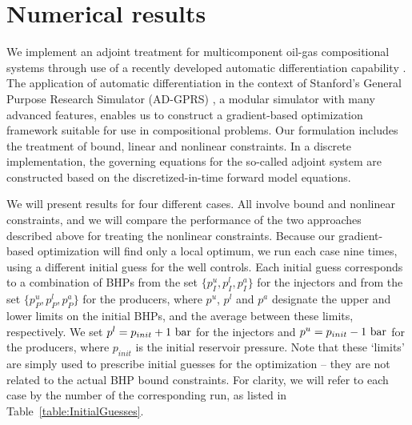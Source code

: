 \chapter{Numerical results}  \label{sec:results}


We implement an adjoint treatment for multicomponent oil-gas
compositional systems through use of a recently developed automatic
differentiation capability \citep{Younis:2010}. The application of automatic
differentiation in the context of Stanford's General Purpose Research Simulator
(AD-GPRS) \citep{Cao:Thesis}, a modular simulator with many advanced features,
enables us to construct a gradient-based optimization framework suitable for
use in compositional problems. Our formulation includes the treatment of
bound, linear and nonlinear constraints. In a discrete implementation, the 
governing equations for the so-called adjoint
system are constructed based on the discretized-in-time forward model
equations. 

We will present results for four different cases. All involve bound and
nonlinear constraints, and we will compare the performance of the two approaches
described above for treating the nonlinear constraints. Because our
gradient-based optimization will find only a local optimum, we run each case
nine times, using a different initial guess for the well controls. Each initial
guess corresponds to a combination of BHPs from the set $\{p_I^u,p_I^l,p_I^a\}$
for the injectors and from the set $\{p_P^u,p_P^l,p_P^a\}$ for the producers,
where $p^u$, $p^l$ and $p^a$ designate the upper and lower limits on the
initial BHPs, and the average between these limits, respectively. We set
$p^l=p_{init}+1~{\rm bar}$ for the injectors and $p^u=p_{init}-1~{\rm bar}$
for the producers, where $p_{init}$ is the initial reservoir pressure. Note
that these `limits' are simply used to prescribe initial guesses for the
optimization -- they are not related to the actual BHP bound constraints.
For clarity, we will refer to each case by the number of the corresponding
run, as listed in Table~\ref{table:InitialGuesses}.




